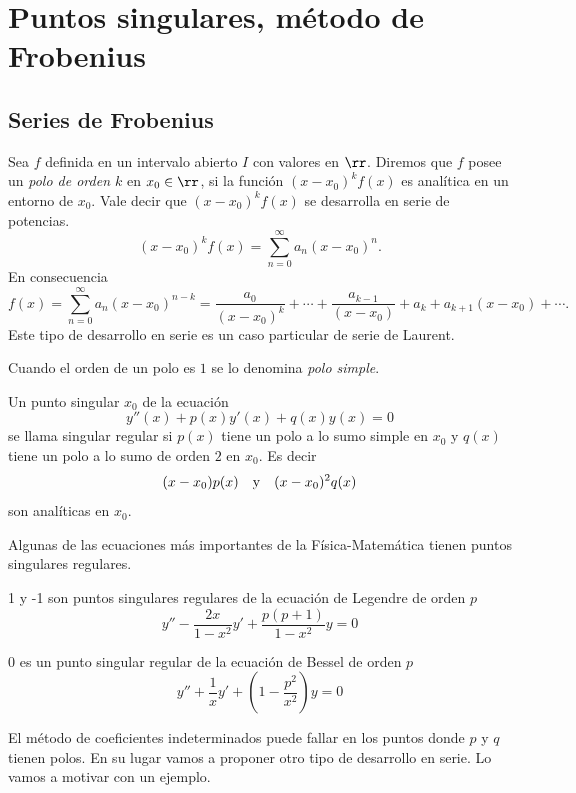 \section{Puntos singulares, método de Frobenius}

\subsection{Series de Frobenius}
\begin{definicion}{} Sea $f$ definida en un intervalo abierto $I$ con valores en $\rr$. Diremos que $f$ posee un \emph{polo de orden $k$} en $x_0\in\rr$, si la función $(x-x_0)^kf(x)$ es analítica en un entorno de $x_0$. Vale decir que $(x-x_0)^kf(x)$ se desarrolla en serie de potencias.
\[(x-x_0)^kf(x)=\sum_{n=0}^{\infty}a_n(x-x_0)^n.\]
En consecuencia
\[f(x)=\sum_{n=0}^{\infty}a_n(x-x_0)^{n-k}=\frac{a_0}{(x-x_0)^k}+\cdots+\frac{a_{k-1}}{(x-x_0)}+a_k+a_{k+1}(x-x_0)+\cdots.\]
Este tipo de desarrollo en serie es un caso particular de serie de Laurent.

Cuando el orden de un polo es $1$ se lo denomina \emph{polo simple}.
\end{definicion}



\begin{definicion}{} Un punto singular $x_0$ de la ecuación
\[y''(x)+p(x)y'(x)+q(x)y(x)=0\]
se llama singular regular si $p(x)$ tiene un polo a lo sumo simple en $x_0$ y $q(x)$ tiene un polo a lo sumo de orden $2$ en $x_0$. Es decir
\[(x-x_0)p(x)\quad\hbox{y}\quad (x-x_0)^2q(x)\]
son analíticas en $x_0$.
\end{definicion}
Algunas de las ecuaciones más importantes de la Física-Matemática tienen puntos singulares regulares.

\begin{ejemplo}{} 1 y -1 son puntos singulares regulares de la ecuación de Legendre de orden $p$
\[y''-\frac{2x}{1-x^2}y'+\frac{p(p+1)}{1-x^2}y=0\]
\end{ejemplo}


\begin{ejemplo}{} 0 es un punto singular regular de la ecuación de Bessel de orden $p$
\[y''+\frac{1}{x}y'+\left(1-\frac{p^2}{x^2}\right)y=0\]
\end{ejemplo}

El método de coeficientes indeterminados puede fallar en los puntos donde $p$ y $q$ tienen polos. En su lugar vamos a proponer otro tipo de desarrollo en serie. Lo vamos a motivar con un ejemplo.

